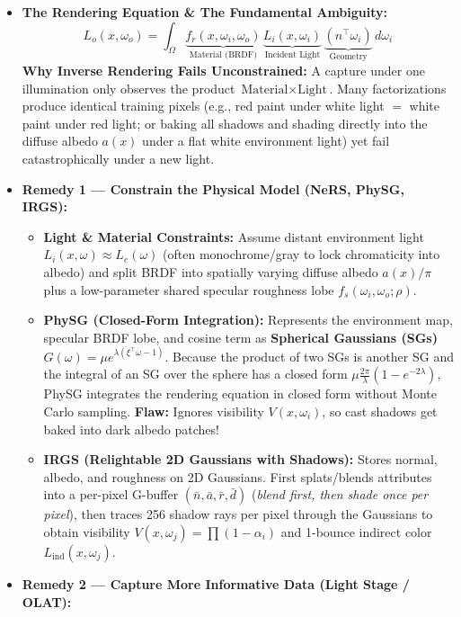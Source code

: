 \documentclass[11pt,a4paper]{article}
\theoremstyle{definition}
\theoremstyle{plain}
\theoremstyle{remark}
\begin{document}
\begin{itemize}
    \item \textbf{The Rendering Equation \& The Fundamental Ambiguity:}
    $$L_o(x, \omega_o) = \int_\Omega \underbrace{f_r(x, \omega_i, \omega_o)}_{\text{Material (BRDF)}} \, \underbrace{L_i(x, \omega_i)}_{\text{Incident Light}} \, \underbrace{(n^\top \omega_i)}_{\text{Geometry}} \, d\omega_i$$
    \textbf{Why Inverse Rendering Fails Unconstrained:} A capture under one illumination only observes the product $\text{Material} \times \text{Light}$. Many factorizations produce identical training pixels (e.g., red paint under white light $=$ white paint under red light; or baking all shadows and shading directly into the diffuse albedo $a(x)$ under a flat white environment light) yet fail catastrophically under a new light.
    \item \textbf{Remedy 1 --- Constrain the Physical Model (NeRS, PhySG, IRGS):}
    \begin{itemize}
        \item \textbf{Light \& Material Constraints:} Assume distant environment light $L_i(x,\omega) \approx L_e(\omega)$ (often monochrome/gray to lock chromaticity into albedo) and split BRDF into spatially varying diffuse albedo $a(x)/\pi$ plus a low-parameter shared specular roughness lobe $f_s(\omega_i, \omega_o; \rho)$.
        \item \textbf{PhySG (Closed-Form Integration):} Represents the environment map, specular BRDF lobe, and cosine term as \textbf{Spherical Gaussians (SGs)} $G(\omega) = \mu e^{\lambda(\xi^\top \omega - 1)}$. Because the product of two SGs is another SG and the integral of an SG over the sphere has a closed form $\mu\frac{2\pi}{\lambda}(1-e^{-2\lambda})$, PhySG integrates the rendering equation in closed form without Monte Carlo sampling. \textbf{Flaw:} Ignores visibility $V(x,\omega_i)$, so cast shadows get baked into dark albedo patches!
        \item \textbf{IRGS (Relightable 2D Gaussians with Shadows):} Stores normal, albedo, and roughness on 2D Gaussians. First splats/blends attributes into a per-pixel G-buffer $(\bar{n}, \bar{a}, \bar{r}, \bar{d})$ (\emph{blend first, then shade once per pixel}), then traces 256 shadow rays per pixel through the Gaussians to obtain visibility $V(x,\omega_j) = \prod(1-\alpha_i)$ and 1-bounce indirect color $L_{\text{ind}}(x,\omega_j)$.
    \end{itemize}
    \item \textbf{Remedy 2 --- Capture More Informative Data (Light Stage / OLAT):}

\end{itemize}
\end{document}
